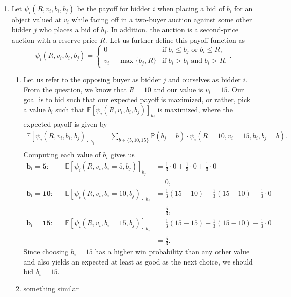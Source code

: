 \documentclass{article}
\newcommand{\pay}[2]{\psi_{#1}\left(#2\right)}
\newcommand{\prob}[1]{\mathbb{P}\left( #1 \right)}
\newcommand{\expp}[1]{\mathbb{E}\left[ #1 \right]}
\begin{document}
\begin{enumerate}
    \item Let $\pay{i}{R,v_i,b_i,b_j}$ be the payoff for bidder $i$ when placing a bid of $b_i$ for an object valued at $v_i$ while facing off in a two-buyer auction against some other bidder $j$ who places a bid of $b_j$. In addition, the auction is a second-price auction with a reserve price $R$. Let us further define this payoff function as 
    $$\pay{i}{R,v_i,b_i,b_j}=\begin{cases}
        0 & \text{if } b_i\leq b_j\text{ or } b_i\leq R, \\
        v_i-\max\{b_j,R\} & \text{if } b_i>b_i \text{ and } b_i>R.
    \end{cases}.$$
    \begin{enumerate}
        \item Let us refer to the opposing buyer as bidder $j$ and ourselves as bidder $i$. From the question, we know that $R=10$ and our value is $v_i=15$. Our goal is to bid such that our expected payoff is maximized, or rather, pick a value $b_i$ such that $\expp{\pay{i}{R,v_i,b_i,b_j}}_{b_j}$ is maximized, where the expected payoff is given by
        \begin{align*}
            \expp{\pay{i}{R,v_i,b_i,b_j}}_{b_j} & =\sum_{b\in\{5,10,15\}} \prob{b_j=b}\cdot\pay{i}{R=10,v_i=15,b_i,b_j=b}. \\
        \end{align*}
        Computing each value of $b_i$ gives us
        \begin{align*}
            \mathbf{b_i=5:} && \expp{\pay{i}{R,v_i,b_i=5,b_j}}_{b_j} & =\frac{1}{3}\cdot0+\frac{1}{3}\cdot0+\frac{1}{3}\cdot0 \\
            &&& =0, \\
            \mathbf{b_i=10:} && \expp{\pay{i}{R,v_i,b_i=10,b_j}}_{b_j} & =\frac{1}{3}(15-10)+\frac{1}{3}(15-10)+\frac{1}{3}\cdot0\\
            &&& =\frac{5}{3}, \\
            \mathbf{b_i=15:} && \expp{\pay{i}{R,v_i,b_i=15,b_j}}_{b_j} & =\frac{1}{3}(15-15)+\frac{1}{3}(15-10)+\frac{1}{3}\cdot0 \\
            &&& =\frac{5}{3}.
        \end{align*}
        Since choosing $b_i=15$ has a higher win probability than any other value and also yields an expected at least as good as the next choice, we should bid $b_i=15$.
        
        \item something similar 
    \end{enumerate}
\end{enumerate}
\end{document}
